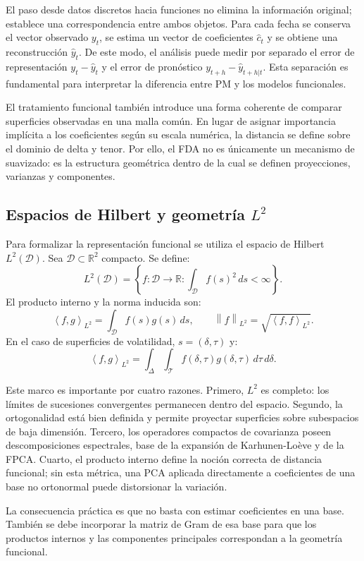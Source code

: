 \documentclass[a4paper,11pt]{article}
\newcommand{\R}{\mathbb{R}}
\newcommand{\norm}[1]{\left\lVert #1 \right\rVert}
\newcommand{\inner}[2]{\left\langle #1,#2 \right\rangle}
\begin{document}
El paso desde datos discretos hacia funciones no elimina la información original; establece una correspondencia entre ambos objetos. Para cada fecha se conserva el vector observado \(y_t\), se estima un vector de coeficientes \(\widehat c_t\) y se obtiene una reconstrucción \(\widehat y_t\). De este modo, el análisis puede medir por separado el error de representación \(y_t-\widehat y_t\) y el error de pronóstico \(y_{t+h}-\widehat y_{t+h|t}\). Esta separación es fundamental para interpretar la diferencia entre PM y los modelos funcionales.

El tratamiento funcional también introduce una forma coherente de comparar superficies observadas en una malla común. En lugar de asignar importancia implícita a los coeficientes según su escala numérica, la distancia se define sobre el dominio de delta y tenor. Por ello, el FDA no es únicamente un mecanismo de suavizado: es la estructura geométrica dentro de la cual se definen proyecciones, varianzas y componentes.

\subsection{Espacios de Hilbert y geometría \texorpdfstring{\(L^2\)}{L2}}

Para formalizar la representación funcional se utiliza el espacio de Hilbert \(L^2(\mathcal{D})\). Sea \(\mathcal{D}\subset\R^2\) compacto. Se define:
\[
  L^2(\mathcal{D})=
  \left\{
  f:\mathcal{D}\to\R:
  \int_{\mathcal{D}} f(s)^2\,ds<\infty
  \right\}.
\]
El producto interno y la norma inducida son:
\[
  \inner{f}{g}_{L^2}=\int_{\mathcal{D}} f(s)g(s)\,ds,
  \qquad
  \norm{f}_{L^2}=\sqrt{\inner{f}{f}_{L^2}}.
\]
En el caso de superficies de volatilidad, \(s=(\delta,\tau)\) y:
\[
  \inner{f}{g}_{L^2}
  =
  \int_{\Delta}\int_{\mathcal{T}}
  f(\delta,\tau)g(\delta,\tau)\,d\tau\,d\delta.
\]

Este marco es importante por cuatro razones. Primero, \(L^2\) es completo: los límites de sucesiones convergentes permanecen dentro del espacio. Segundo, la ortogonalidad está bien definida y permite proyectar superficies sobre subespacios de baja dimensión. Tercero, los operadores compactos de covarianza poseen descomposiciones espectrales, base de la expansión de Karhunen-Loève y de la FPCA. Cuarto, el producto interno define la noción correcta de distancia funcional; sin esta métrica, una PCA aplicada directamente a coeficientes de una base no ortonormal puede distorsionar la variación.

La consecuencia práctica es que no basta con estimar coeficientes en una base. También se debe incorporar la matriz de Gram de esa base para que los productos internos y las componentes principales correspondan a la geometría funcional.
\end{document}
